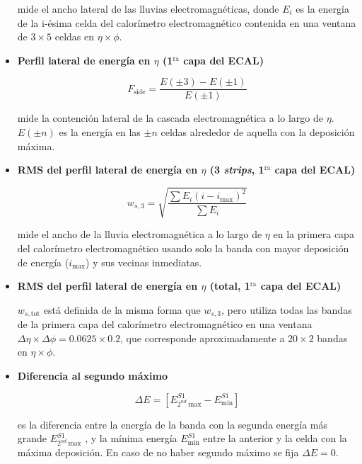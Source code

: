 \begin{itemize}
		mide el ancho lateral de las lluvias electromagnéticas, donde $E_{i}$ es la energía de la i-ésima celda del calorímetro electromagnético contenida en una ventana de $3\times 5$ celdas en $\eta \times \phi$.

	\item  \textbf{Perfil lateral de energía en $\eta$ (1$^{\text{ra}}$ capa del ECAL)}

		\begin{equation}
		F_{\text{side}}=\frac{E(\pm 3)-E(\pm 1)}{E(\pm 1)}
		\end{equation}

		mide la contención lateral de la cascada electromagnética a lo largo de $\eta$. $E(\pm n)$ es la energía en las $\pm n$ celdas alrededor de aquella con la deposición máxima.

	\item  \textbf{RMS del perfil lateral de energía en $\eta$ (3 \textit{strips}, 1$^{\text{ra}}$ capa del ECAL)}

		\begin{equation}
		w_{s,3}=\sqrt{\frac{\sum E_{i}(i-i_{\text{max}})^{2}}{\sum E_{i}}}
		\end{equation}

		mide el ancho de la lluvia electromagnética a lo largo de $\eta$ en la primera capa del calorímetro electromagnético usando solo la banda con mayor deposición de energía ($i_{\text{max}}$) y sus vecinas inmediatas.

	\item  \textbf{RMS del perfil lateral de energía en $\eta$ (total, 1$^{\text{ra}}$ capa del ECAL)}

		$w_{s,\text{tot}}$ está definida de la misma forma que $w_{s,3}$, pero utiliza todas las bandas de la primera capa del calorímetro electromagnético en una ventana $\Delta\eta\times\Delta\phi = 0.0625 \times 0.2$, que corresponde aproximadamente a $20\times 2$ bandas en $\eta \times \phi$.

	\item  \textbf{Diferencia al segundo máximo}

		\begin{equation}
		\Delta E=[E_{2^{nd} \:\text{max}}^{S1} - E_{\text{min}}^{S1}]
		\end{equation}

		es la diferencia entre la energía de la banda con la segunda energía más grande $E_{2^{nd} \:\text{max}}^{S1}$ , y la mínima energía $E_{\text{min}}^{S1}$ entre la anterior y la celda con la máxima deposición. En caso de no haber segundo máximo se fija $\Delta E = 0$.


\end{itemize}
